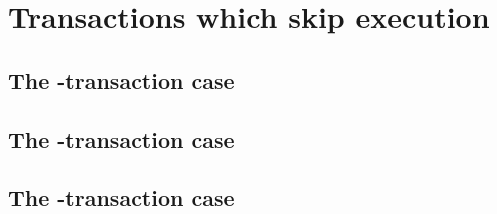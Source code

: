 
\section{Transactions which skip \evm{} execution \lispTodo{}}
\subsection{The \sysi{}-transaction case}     \label{hub: tx skip: sysi}     
\subsection{The \user{}-transaction case}     \label{hub: tx skip: user}     
\subsection{The \sysf{}-transaction case}     \label{hub: tx skip: sysf}     
